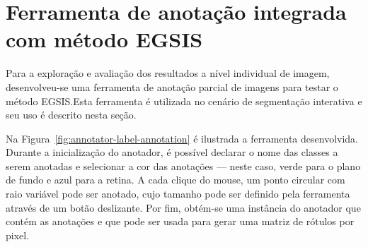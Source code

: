 \section{Ferramenta de anotação integrada com método EGSIS}\label{sec:ferramenta-anotacao}

Para a exploração e avaliação dos resultados a nível individual de
imagem, desenvolveu-se uma ferramenta de anotação parcial de imagens
para testar o método EGSIS.\@ Esta ferramenta é utilizada no cenário de
segmentação interativa e seu uso é descrito nesta seção.


\begin{figure}[h!]
        \captionsetup{width=14.5cm}
		\centering
\end{figure}
\FloatBarrier{}


Na Figura~\ref{fig:annotator-label-annotation} é ilustrada a ferramenta
desenvolvida. Durante a inicialização do anotador, é possível declarar
o nome das classes a serem anotadas e selecionar a cor das anotações
{---} neste caso, verde para o plano de fundo e azul para a retina. A
cada clique do mouse, um ponto circular com raio variável pode ser
anotado, cujo tamanho pode ser definido pela ferramenta através de um
botão deslizante. Por fim, obtém-se uma instância do anotador que
contém as anotações e que pode ser usada para gerar uma matriz de
rótulos por pixel.

